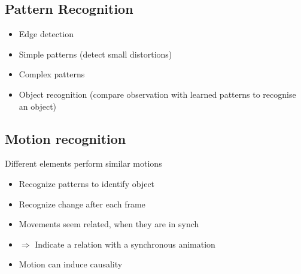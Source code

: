 \documentclass[ngerman]{scrartcl}
\begin{document}
\subsection{Pattern Recognition}
\begin{itemize}
  \item Edge detection
  \item Simple patterns (detect small distortions)
  \item Complex patterns
  \item Object recognition (compare observation with learned patterns to recognise an object)
\end{itemize}


\subsection{Motion recognition}
Different elements perform similar motions
\begin{itemize}
  \item Recognize patterns to identify object
  \item Recognize change after each frame
  \item Movements seem related, when they are in synch
  \item $ \Rightarrow $ Indicate a relation with a synchronous animation 
  \item Motion can induce causality
\end{itemize}
\end{document}
